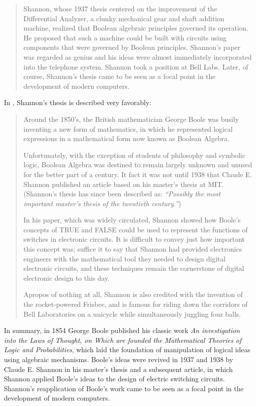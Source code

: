\begin{quote}
Shannon, whose 1937 thesis centered on the improvement of the 
Differential Analyzer, a clunky mechanical gear and shaft addition
machine, realized that Boolean algebraic principles governed its operation.
He proposed that such a machine could be built with circuits using 
components that were governed by Boolean principles.  Shannon's paper
was regarded as genius and his ideas were almost immediately
incorporated into the telephone system.  Shannon took a position at Bell
Labs.  Later, of course, Shannon's thesis came to be seen as a focal point
in the development of modern computers.
\end{quote}

In \cite{bibref:w:boolealghist02}, Shannon's thesis is described
very favorably:

\begin{quote}
Around the 1850's, the British mathematician George Boole was 
busily inventing a new form of mathematics, in which he represented
logical expressions in a mathematical form now known as
Boolean Algebra.

Unfortunately, with the exception of students of philosophy
and symbolic logic, Boolean Algebra was destined to remain 
largely unknown and unused for the better part of a century.
It fact it was not until 1938 that Claude E. Shannon published
an article based on his master's thesis at MIT.  (Shannon's
thesis has since been described as: \emph{``Possibly the
most important master's thesis of the twentieth century.''})

In his paper, which was widely circulated, Shannon showed how
Boole's concepts of TRUE and FALSE could be used to represent
the functions of switches in electronic circuits.  It is difficult
to convey just how important this concept was; suffice it to say
that Shannon had provided electronics engineers with the mathematical
tool they needed to design digital electronic circuits, and these 
techniques remain the cornerstone of digital electronic
design to this day.

Apropos of nothing at all, Shannon is also credited with the invention
of the rocket-powered Frisbee, and is famous for riding down the
corridors of Bell Laboratories on a unicycle while simultaneously
juggling four balls.
\end{quote}

In summary, in 1854 George Boole published his classic work 
\emph{An investigation into the Laws of Thought, on 
Which are founded the Mathematical Theories of Logic and Probabilities},
which laid the foundation of manipulation of 
logical ideas using algebraic mechanisms.  Boole's ideas 
were revived in 1937 and 1938 by Claude E. Shannon
in his master's thesis and a subsequent article, in which
Shannon applied Boole's ideas to the design of electric
switching circuits.  Shannon's reapplication of Boole's work
came to be seen as a focal point in the development of modern
computers.


